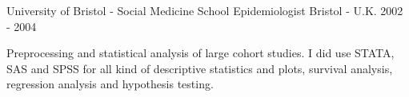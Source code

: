\begin{cventries}

\cventry
{University of Bristol - Social Medicine School} %
{Epidemiologist} %
{Bristol - U.K.} %
{2002 - 2004} %
{ %
\begin{cvitems}
\item {
Preprocessing and statistical analysis of large cohort studies.
I did use STATA, SAS and SPSS for all kind of descriptive statistics and plots,
survival analysis, regression analysis and hypothesis testing.}
\end{cvitems}        
}


\end{cventries}
